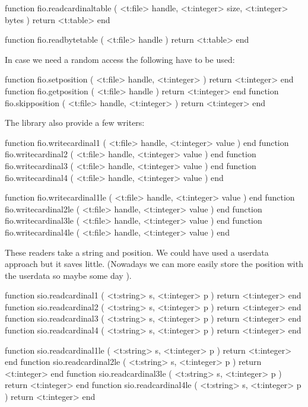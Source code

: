 function fio.readcardinaltable (
    <t:file>    handle,
    <t:integer> size,
    <t:integer> bytes
)
    return <t:table>
end

function fio.readbytetable (
    <t:file> handle
)
    return <t:table>
end
\stoptyping

In case we need a random access the following have to be used:

\starttyping[option=LUA]
function fio.setposition  ( <t:file> handle, <t:integer> ) return <t:integer> end
function fio.getposition  ( <t:file> handle              ) return <t:integer> end
function fio.skipposition ( <t:file> handle, <t:integer> ) return <t:integer> end
\stoptyping

The library also provide a few writers:

\starttyping[option=LUA]
function fio.writecardinal1 ( <t:file> handle, <t:integer> value ) end
function fio.writecardinal2 ( <t:file> handle, <t:integer> value ) end
function fio.writecardinal3 ( <t:file> handle, <t:integer> value ) end
function fio.writecardinal4 ( <t:file> handle, <t:integer> value ) end

function fio.writecardinal1le ( <t:file> handle, <t:integer> value ) end
function fio.writecardinal2le ( <t:file> handle, <t:integer> value ) end
function fio.writecardinal3le ( <t:file> handle, <t:integer> value ) end
function fio.writecardinal4le ( <t:file> handle, <t:integer> value ) end
\stoptyping

\stopsubsection

\startsubsection[title=Reading from a string]

These readers take a string and position. We could have used a userdata approach
but it saves little. (Nowadays we can more easily store the position with the
userdata so maybe some day \unknown).

\starttyping[option=LUA]
function sio.readcardinal1 ( <t:string> s, <t:integer> p ) return <t:integer> end
function sio.readcardinal2 ( <t:string> s, <t:integer> p ) return <t:integer> end
function sio.readcardinal3 ( <t:string> s, <t:integer> p ) return <t:integer> end
function sio.readcardinal4 ( <t:string> s, <t:integer> p ) return <t:integer> end

function sio.readcardinal1le ( <t:string> s, <t:integer> p ) return <t:integer> end
function sio.readcardinal2le ( <t:string> s, <t:integer> p ) return <t:integer> end
function sio.readcardinal3le ( <t:string> s, <t:integer> p ) return <t:integer> end
function sio.readcardinal4le ( <t:string> s, <t:integer> p ) return <t:integer> end

